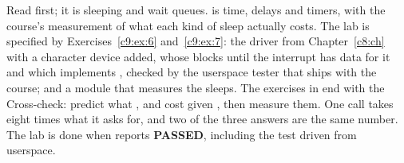 Read  first; it is sleeping and wait queues.  is time, delays and
timers, with the course's measurement of what each kind of sleep actually costs. The lab is
specified by Exercises~\ref{c9:ex:6} and~\ref{c9:ex:7}: the driver from Chapter~\ref{c8:ch} with a
character device added, whose  blocks until the interrupt has data for it and which
implements , checked by the userspace tester  that ships with the
course; and a module that measures the sleeps. The exercises in  end with
the Cross-check: predict what ,  and  cost given
, then measure them. One call takes eight times what it asks for, and two of the three
answers are the same number. The lab is done when  reports \textbf{PASSED},
including the  test driven from userspace.





